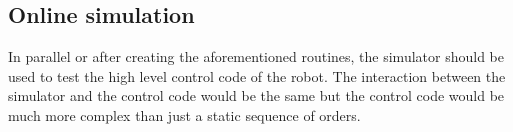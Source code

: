 \subsection{Online simulation}
In parallel or after creating the aforementioned routines, the simulator should be used to test the high level control code of the robot. The interaction between the simulator and the control code would be the same but the control code would be much more complex than just a static sequence of orders.

